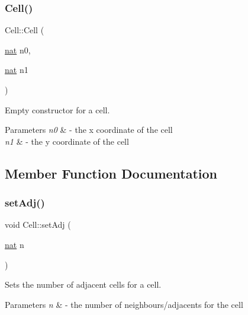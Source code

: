 \subsubsection{\texorpdfstring{Cell()}{Cell()}}
{\footnotesize\ttfamily Cell\+::\+Cell (\begin{DoxyParamCaption}\item[{\hyperlink{_cell_types_8h_a56638ee9d162e8cce3a15f92d2023d6e}{nat}}]{n0,  }\item[{\hyperlink{_cell_types_8h_a56638ee9d162e8cce3a15f92d2023d6e}{nat}}]{n1 }\end{DoxyParamCaption})}



Empty constructor for a cell. 


\begin{DoxyParams}{Parameters}
{\em n0} & -\/ the x coordinate of the cell \\
\hline
{\em n1} & -\/ the y coordinate of the cell \\
\hline
\end{DoxyParams}


\subsection{Member Function Documentation}
\mbox{\label{class_cell_a78a948c77f34c1801f427b3b11ddd731}} 
\subsubsection{\texorpdfstring{set\+Adj()}{setAdj()}}
{\footnotesize\ttfamily void Cell\+::set\+Adj (\begin{DoxyParamCaption}\item[{\hyperlink{_cell_types_8h_a56638ee9d162e8cce3a15f92d2023d6e}{nat}}]{n }\end{DoxyParamCaption})}



Sets the number of adjacent cells for a cell. 


\begin{DoxyParams}{Parameters}
{\em n} & -\/ the number of neighbours/adjacents for the cell \\
\hline
\end{DoxyParams}
\mbox{\label{class_cell_a0a162ed55d7c945b9f44d71a0a9ce5ad}} 

